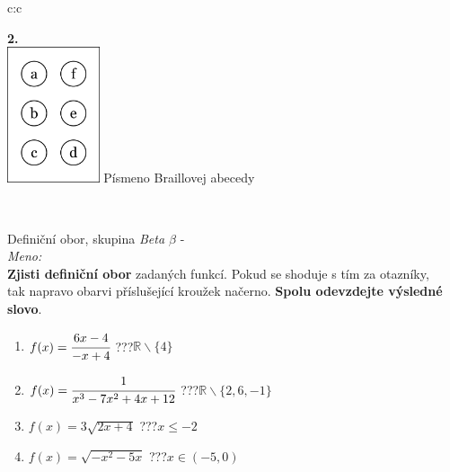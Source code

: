 \documentclass[10pt]{report}
\begin{document}
\begin{tabular}{c:c}
\begin{minipage}[c][99mm][t]{0.49\linewidth}
\begin{center}
\begin{minipage}{0.77\linewidth}
\begin{center}
\begin{varwidth}{\textwidth}
\begin{enumerate}
\end{enumerate}
\end{varwidth}
\end{center}
\end{minipage}
\begin{minipage}{0.20\linewidth}
\begin{center}
{\Huge\bfseries 2.} \\[2mm]
\includegraphics[height=40mm]{../images/braille.png}
{\small Písmeno Braillovej abecedy}
\end{center}
\end{minipage}
\end{center}
\end{minipage}
\\ \hdashline
\begin{minipage}[c][99mm][t]{0.49\linewidth}
\begin{center}
\vspace{7mm}
{\huge Definiční obor, skupina \textit{Beta $\beta$} -}\\[4.5mm]
\textit{Meno:}\phantom{xxxxxxxxxxxxxxxxxxxxxxxxxxxxxxxxxxxxxxxxxxxxxxxxxxxxxxxxxxxxxxxxx}\\[3.5mm]
\textbf{Zjisti definiční obor} zadaných funkcí. Pokud se shoduje s tím za otazníky,\\tak napravo obarvi příslušející kroužek načerno. \textbf{Spolu odevzdejte výsledné slovo}.\\[3mm]
\begin{minipage}{0.77\linewidth}
\begin{center}
\begin{varwidth}{\textwidth}
\begin{enumerate}
\normalsize
\item $f(x)=\cfrac{6x-4}{-x+4}$\quad \dotfill\; ???\;\dotfill \quad $\mathbb{R}\smallsetminus\{4\}$
\item $f(x)=\cfrac{1}{x^3-7x^2+4x+12}$\quad \dotfill\; ???\;\dotfill \quad $\mathbb{R}\smallsetminus\{2,6,-1\}$
\item $f(x)=3\sqrt{2x+4}$\quad \dotfill\; ???\;\dotfill \quad $x\leq-2$
\item $f(x)=\sqrt{-x^2-5x}$\quad \dotfill\; ???\;\dotfill \quad $x\in(-5 , 0)$

\end{enumerate}
\end{varwidth}
\end{center}
\end{minipage}
\end{center}
\end{minipage}
\end{tabular}
\end{document}
